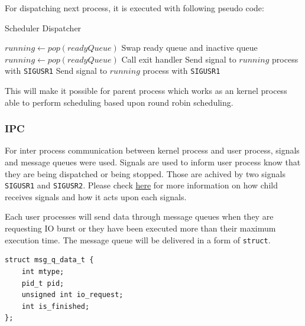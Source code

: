 \documentclass{homework}
\begin{document}
For dispatching next process, it is executed with following pseudo code:
\begin{algorithm}
\caption{Scheduler Dispatcher}\label{alg:cap}
\begin{algorithmic}
    \State $running \gets pop(readyQueue)$
     
        \State Swap ready queue and inactive queue
        \State $running \gets pop(readyQueue)$
         
            \State Call exit handler
        \Else
            \State Send signal to $running$ process with \texttt{SIGUSR1} 
        \EndIf
    \Else
        \State Send signal to $running$ process with \texttt{SIGUSR1} 
    \EndIf
\end{algorithmic}
\end{algorithm}

This will make it possible for parent process which works as an kernel process able to perform scheduling based upon round robin scheduling. 

\subsubsection{IPC}
For inter process communication between kernel process and user process, signals and message queues were used. Signals are used to inform user process know that they are being dispatched or being stopped. Those are achived by two signals \texttt{SIGUSR1} and \texttt{SIGUSR2}. Please check \hyperref[sec:childSignals]{here} for more information on how child receives signals and how it acts upon each signals.

Each user processes will send data through message queues when they are requesting IO burst or they have been executed more than their maximum execution time. The message queue will be delivered in a form of \texttt{struct}. 
\\
\begin{center}
\begin{code}
\begin{verbatim}
struct msg_q_data_t {
    int mtype; 
    pid_t pid;
    unsigned int io_request;
    int is_finished;
};
\end{verbatim}
\end{code}
\end{center}
\end{document}
